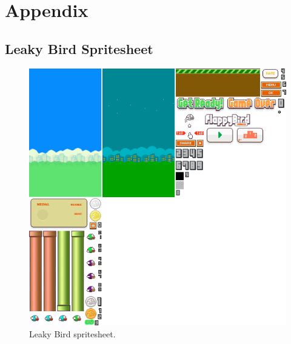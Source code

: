 \section{Appendix}
\subsection{Leaky Bird Spritesheet}
\begin{figure}[h!]
\centering\includegraphics[width=\linewidth]{design/figures/leaky-spritesheet.png}
\caption{Leaky Bird spritesheet.}
\label{fig:leaky-spritesheet}
\end{figure}
\clearpage